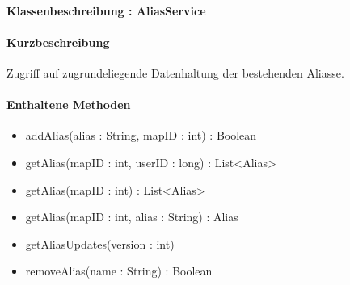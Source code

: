 \paragraph{Klassenbeschreibung : AliasService}%
\paragraph*{Kurzbeschreibung}
Zugriff auf zugrundeliegende Datenhaltung der bestehenden Aliasse.
\paragraph*{Enthaltene Methoden}
\begin{itemize}
    \item addAlias(alias : String, mapID : int) : Boolean
    \item getAlias(mapID : int, userID : long) : List<Alias>
    \item getAlias(mapID : int) : List<Alias>
    \item getAlias(mapID : int, alias : String) : Alias
    \item getAliasUpdates(version : int)
    \item removeAlias(name : String) : Boolean
\end{itemize}
